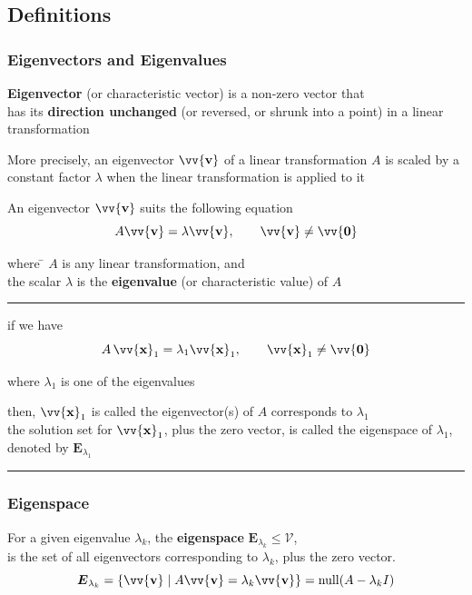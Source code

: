 \documentclass[11pt]{article}
\DeclareRobustCommand{\myvec}[1]{\vv{\mathbf{#1}}}
\newcommand{\myvecsp}[1]{\bm{\mathcal{#1}}}
\newcommand{\mysubvecsp}[1]{\bm{{#1}}}
\newcommand{\mymat}[1]{#1}
\begin{document}
    \subsection{Definitions}
    \subsubsection{Eigenvectors and Eigenvalues}
    \textbf{Eigenvector} (or characteristic vector) is a non-zero vector that \\
    has its \textbf{direction unchanged} (or reversed, or shrunk into a point) in a linear transformation
    \vspace{\belowdisplayshortskip}

    More precisely, an eigenvector $\myvec{v}$ of a linear transformation $\mymat{A}$ is scaled by a constant factor $\lambda$ when the linear transformation is applied to it
    \vspace{\belowdisplayshortskip}

    \noindent
    \begin{minipage}{\linewidth}
        An eigenvector $\myvec{v}$ suits the following equation
        \begin{equation}
            \mymat{A}\myvec{v} = \lambda\myvec{v}, \qquad \myvec{v} \ne \myvec{0}
        \end{equation} 
        \begin{tabbing}
            where \= $\mymat{A}$ is any linear transformation, and\\
            \> the scalar $\lambda$ is the \textbf{eigenvalue} (or characteristic value) of $\mymat{A}$ 
        \end{tabbing}
    \end{minipage}
    \hbox{}

    \noindent \rule{\textwidth}{0.1pt} 
    if we have
    \[ \mymat{A}\,\myvec{x}_1 = \lambda_1 \myvec{x}_1, \qquad \myvec{x}_1 \ne \myvec{0} \]
    \begin{center}
        where $\lambda_1$ is one of the eigenvalues
    \end{center}
    then, $\myvec{x}_1$ is called the eigenvector(s) of $\mymat{A}$ corresponds to $\lambda_1$\\
    the solution set for $\myvec{x}_1$, plus the zero vector, is called the eigenspace of $\lambda_1$, denoted by $\mysubvecsp{E}_{\lambda_1}$
    \noindent \rule{\textwidth}{0.1pt} 

    \subsubsection{Eigenspace}
    For a given eigenvalue $\lambda_k$, the \textbf{eigenspace} $\mysubvecsp{E}_{\lambda_k} \le \myvecsp{V}$, \\
    is the set of all eigenvectors corresponding to $\lambda_k$, plus the zero vector.
    \begin{equation}
        \mysubvecsp{E}_{\lambda_k} = \{ \myvec{v} \mid \mymat{A}\myvec{v} = \lambda_k\myvec{v} \} = \operatorname{null}(\mymat{A}-\lambda_k \mymat{I})
    \end{equation}
\end{document}
